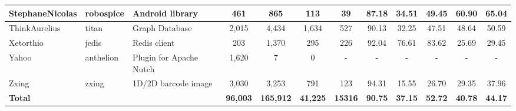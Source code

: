 \begin{landscape}
\begin{table}
\begin{tabular}{lllccccccccc}
StephaneNicolas             & robospice                                                     & Android library                                                          & 461             & 865              & 113                                                              & 39             & 87.18          & 34.51          & 49.45          & 60.90                                                             & 65.04                                                              \\ \hline
ThinkAurelius               & titan                                                         & Graph Database                                                           & 2,015           & 4,434             & 1,634                                                            & 527            & 90.13          & 32.25          & 47.51          & 48.64                                                             & 50.59                                                              \\ \hline
Xetorthio                   & jedis                                                         & Redis client                                                             & 203             & 1,370             & 295                                                              & 226            & 92.04          & 76.61          & 83.62          & 25.69                                                             & 29.45                                                              \\ \hline
Yahoo                       & anthelion                                                     & Plugin for Apache Nutch                                                  & 1,620            & 7                & 0                                                                & -              & -              & -              & -              & -                                                                 & -                                                                  \\ \hline
Zxing                       & zxing                                                         & 1D/2D barcode image                                                      & 3,030           & 3,253            & 791                                                              & 123            & 94.31          & 15.55          & 26.70          & 29.35                                                             & 37.96                                                              \\ \hline
\textbf{Total}              & \textbf{}                                                     & \textbf{}                                                                & \textbf{96,003} & \textbf{165,912} & \textbf{41,225}                                                  & \textbf{15316} & \textbf{90.75} & \textbf{37.15} & \textbf{52.72} & \textbf{40.78}                                                    & \textbf{44.17}                                                     \\ \hline
\end{tabular}%
\end{table}
\end{landscape}